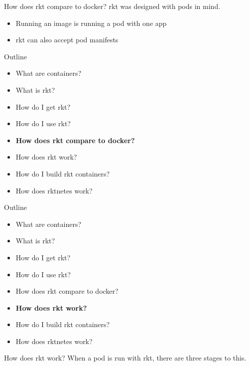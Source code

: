 \documentclass[pdf,aspectratio=169]{beamer}
\begin{document}
\begin{frame}{How does rkt compare to docker?}
    rkt was designed with pods in mind.
    \begin{itemize}
        \item Running an image is running a pod with one app
        \item rkt can also accept pod manifests
    \end{itemize}
\end{frame}


\begin{frame}
    Outline
    \begin{itemize}
        \item What are containers?
        \item What is rkt?
        \item How do I get rkt?
        \item How do I use rkt?
        \item \textbf{How does rkt compare to docker?}
        \item How does rkt work?
        \item How do I build rkt containers?
        \item How does rktnetes work?
    \end{itemize}
\end{frame}

\begin{frame}
    Outline
    \begin{itemize}
        \item What are containers?
        \item What is rkt?
        \item How do I get rkt?
        \item How do I use rkt?
        \item How does rkt compare to docker?
        \item \textbf{How does rkt work?}
        \item How do I build rkt containers?
        \item How does rktnetes work?
    \end{itemize}
\end{frame}

\begin{frame}{How does rkt work?}
    When a pod is run with rkt, there are three stages to this.
\end{frame}
\end{document}
